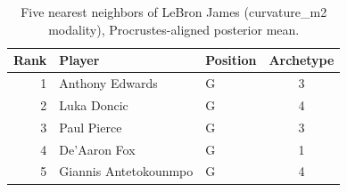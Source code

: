 \begin{table}[htbp]
  \centering\small
  \begin{tabular}{rllc}
    \toprule
    Rank & Player & Position & Archetype \\
    \midrule
    1 & Anthony Edwards & G & 3 \\
    2 & Luka Doncic & G & 4 \\
    3 & Paul Pierce & G & 3 \\
    4 & De'Aaron Fox & G & 1 \\
    5 & Giannis Antetokounmpo & G & 4 \\
    \bottomrule
  \end{tabular}
  \caption{Five nearest neighbors of LeBron James (curvature_m2 modality), Procrustes-aligned posterior mean.}
  \label{tab:LeBron_James_neighbors_curvature_m2}
\end{table}

